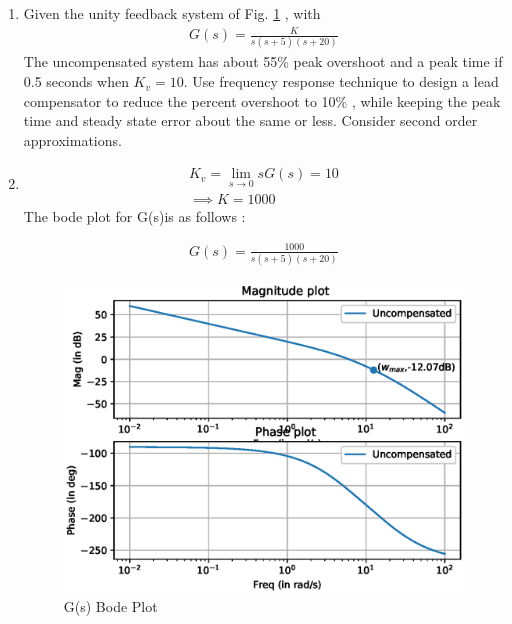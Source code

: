 
\begin{enumerate}[label=\thesubsection.\arabic*.,ref=\thesubsection.\theenumi]

\item
Given the unity feedback system of Fig. \ref{fig:ee18btech11026_block_1} , with 
\begin{align}
    G(s) = \frac{K}{s(s+5)(s+20)}
\end{align}
The uncompensated system has about 55\% peak overshoot and a peak time if 0.5 seconds when $K_{v} = 10$. Use frequency response technique to design a lead compensator to reduce the percent overshoot to 10\% , while keeping the peak time and steady state error about the same or less.
Consider second order approximations.
\begin{figure}[!ht]
\begin{center}
\end{center}
    \caption{}
    \label{fig:ee18btech11026_block_1}
\end{figure}

\item
\solution

\begin{align}
    K_{v} = \lim_{s \to 0} s G(s) = 10\\
    \implies K = 1000
\end{align}
The bode plot for G(s)is as follows : 

\begin{align}
    G(s) = \frac{1000}{s(s+5)(s+20)}
\end{align}

\begin{figure}[!h]
    \centering
    \includegraphics[width=\columnwidth]{./figs/ee18btech11026/ee18btech11026_1.eps}
    \caption{G(s) Bode Plot}
    \label{fig:ee18btech11026_1}
\end{figure}


\end{enumerate}
